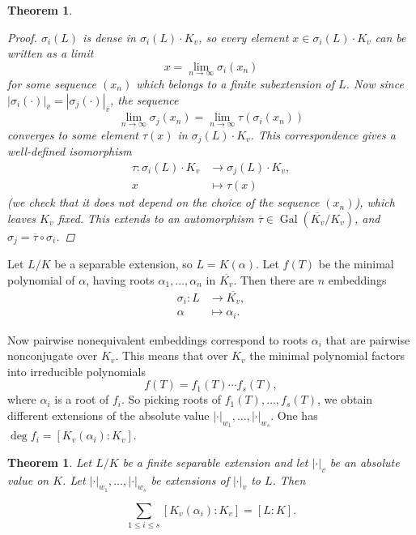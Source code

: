 \documentclass{article}
\DeclareMathOperator{\Gal}{Gal}
\theoremstyle{myplain}
\newtheorem{theorem}[proposition]{Theorem}
\theoremstyle{mydefinition}
\begin{document}
\begin{theorem}
\begin{proof}
    $\sigma_i (L)$ is dense in $\sigma_i (L)\cdot K_v$, so every element
    $x \in \sigma_i (L)\cdot K_v$ can be written as a limit
    $$x = \lim_{n\to\infty} \sigma_i (x_n)$$
    for some sequence $(x_n)$ which belongs to a finite subextension of $L$.
    Now since
    $|\sigma_i (\cdot)|_{\overline{v}} = |\sigma_j (\cdot)|_{\overline{v}}$, the
    sequence
    $$\lim_{n\to\infty} \sigma_j (x_n) = \lim_{n\to \infty} \tau (\sigma_i (x_n))$$
    converges to some element $\tau (x)$ in $\sigma_j (L)\cdot K_v$. This
    correspondence gives a well-defined isomorphism
    \begin{align*}
      \tau\colon \sigma_i (L)\cdot K_v & \to \sigma_j (L)\cdot K_v,\\
      x & \mapsto \tau (x)
    \end{align*}
    (we check that it does not depend on the choice of the sequence $(x_n)$),
    which leaves $K_v$ fixed. This extends to an automorphism
    $\overline{\tau} \in \Gal (\overline{K_v} / K_v)$, and
    $\sigma_j = \overline{\tau}\circ \sigma_i$.
  \end{proof}
\end{theorem}

\vspace{1em}

Let $L/K$ be a separable extension, so $L = K(\alpha)$. Let $f (T)$ be the
minimal polynomial of $\alpha$, having roots $\alpha_1, \ldots, \alpha_n$ in
$\overline{K_v}$. Then there are $n$ embeddings
\begin{align*}
  \sigma_i\colon L & \to \overline{K_v},\\
  \alpha & \mapsto \alpha_i.
\end{align*}

Now pairwise nonequivalent embeddings correspond to roots $\alpha_i$ that are
pairwise nonconjugate over $K_v$. This means that over $K_v$ the minimal
polynomial factors into irreducible polynomials
$$f (T) = f_1 (T) \cdots f_s (T),$$
where $\alpha_i$ is a root of $f_i$. So picking roots of
$f_1 (T), \ldots, f_s (T)$, we obtain different extensions of the absolute value
$|\cdot|_{w_1}, \ldots, |\cdot|_{w_s}$. One has
$\deg f_i = [K_v (\alpha_i) : K_v]$.

\begin{theorem}\label{theorem:local-degrees-global-degree}
  Let $L/K$ be a finite separable extension and let $|\cdot|_v$ be an absolute
  value on $K$. Let $|\cdot|_{w_1}, \ldots, |\cdot|_{w_s}$ be extensions of
  $|\cdot|_v$ to $L$. Then

  \[ \sum_{1 \le i \le s} [K_v (\alpha_i) : K_v] = [L : K]. \]
\end{theorem}
\end{document}
